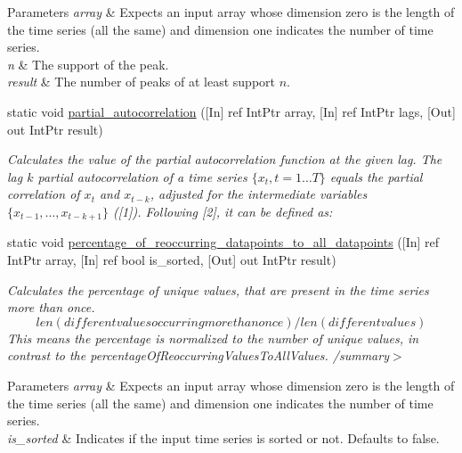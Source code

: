 \begin{DoxyCompactItemize}
\begin{DoxyCompactList}
\begin{DoxyParams}{Parameters}
{\em array} & Expects an input array whose dimension zero is the length of the time series (all the same) and dimension one indicates the number of time series.\\
\hline
{\em n} & The support of the peak.\\
\hline
{\em result} & The number of peaks of at least support $n$.\\
\hline
\end{DoxyParams}
\end{DoxyCompactList}\item 
static void \mbox{\hyperlink{classkhiva_1_1interop_1_1_d_l_l_features_a94abb3453dc0a6b6055f04aad906b654}{partial\+\_\+autocorrelation}} (\mbox{[}In\mbox{]} ref Int\+Ptr array, \mbox{[}In\mbox{]} ref Int\+Ptr lags, \mbox{[}Out\mbox{]} out Int\+Ptr result)
\begin{DoxyCompactList}\small\item\em Calculates the value of the partial autocorrelation function at the given lag. The lag $k$ partial autocorrelation of a time series $\lbrace x_t, t = 1 \ldots T \rbrace$ equals the partial correlation of $x_t$ and $x_{t-k}$, adjusted for the intermediate variables $\lbrace x_{t-1}, \ldots, x_{t-k+1} \rbrace$ (\mbox{[}1\mbox{]}). Following \mbox{[}2\mbox{]}, it can be defined as\+: \end{DoxyCompactList}\item 
static void \mbox{\hyperlink{classkhiva_1_1interop_1_1_d_l_l_features_a413b1a77d06c42c21608e9f26492e5b5}{percentage\+\_\+of\+\_\+reoccurring\+\_\+datapoints\+\_\+to\+\_\+all\+\_\+datapoints}} (\mbox{[}In\mbox{]} ref Int\+Ptr array, \mbox{[}In\mbox{]} ref bool is\+\_\+sorted, \mbox{[}Out\mbox{]} out Int\+Ptr result)
\begin{DoxyCompactList}\small\item\em Calculates the percentage of unique values, that are present in the time series more than once. \[ len(different values occurring more than once) / len(different values) \] This means the percentage is normalized to the number of unique values, in contrast to the percentage\+Of\+Reoccurring\+Values\+To\+All\+Values. /summary$>$ 
\begin{DoxyParams}{Parameters}
{\em array} & Expects an input array whose dimension zero is the length of the time series (all the same) and dimension one indicates the number of time series.\\
\hline
{\em is\+\_\+sorted} & Indicates if the input time series is sorted or not. Defaults to false.\\

\end{DoxyParams}
\end{DoxyCompactList}
\end{DoxyCompactItemize}
